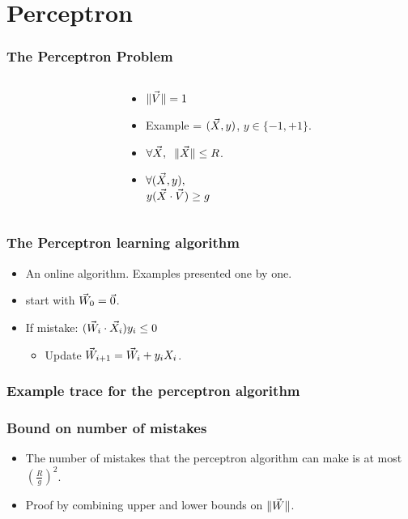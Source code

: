 \documentclass{beamer}
\begin{document}

\section{Perceptron}

\begin{frame}
\frametitle{The Perceptron Problem}
\begin{columns}
\begin{column}[T]{5.2cm}
\end{column}

\begin{column}[T]{4cm}
\begin{itemize}
\item
$\| \vec{V} \| =1$
\item 
Example = $(\vec{X},y)$, $y \in \{-1,+1\}$.
\item
$\forall \vec{X},\;\; \| \vec{X} \| \leq R$.
\item
$\forall (\vec{X},y),$\\$y(\vec{X} \cdot \vec{V}) \geq g$
\end{itemize}
\end{column}
\end{columns}

\end{frame}

\begin{frame}
\frametitle{The Perceptron learning algorithm}
\begin{itemize}
\item An online algorithm. Examples presented one by one.
\item start with $\vec{W}_0 = \vec{0}$.
\item If mistake: $(\vec{W}_i \cdot \vec{X}_i) y_i \leq  0$
\begin{itemize}
\item Update $\vec{W}_{i+1} = \vec{W}_i + y_i X_i$.
\end{itemize}
\end{itemize}
\end{frame}

\begin{frame}
\frametitle{Example trace for the perceptron algorithm}
\end{frame}

\begin{frame}
\frametitle{Bound on number of mistakes}
\begin{itemize}
\item The number of mistakes that the perceptron algorithm can make is at most
$\left(\frac{R}{g}\right)^2$.
\item Proof by combining upper and lower bounds on $\| \vec{W} \|$.
\end{itemize}
\end{frame}
\end{document}
